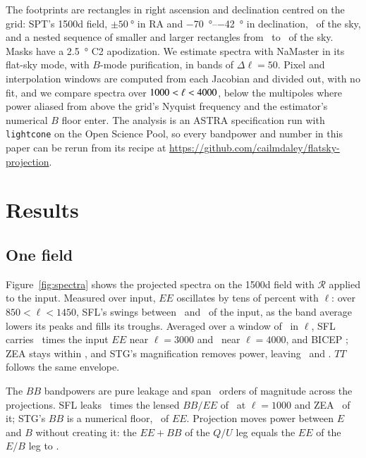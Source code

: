 \documentclass{aa}
\begin{document}
The footprints are rectangles in right ascension and declination centred on the grid: SPT's 1500d field, $\pm\SI{50}{\degree}$ in RA and \SIrange{-70}{-42}{\degree} in declination, \fieldfsky\ of the sky, and a nested sequence of smaller and larger rectangles from \sweepfskylo\ to \sweepfskyhi\ of the sky.
Masks have a \SI{2.5}{\degree} C2 apodization.
We estimate spectra with NaMaster \citep{alonso19} in its flat-sky mode, with $B$-mode purification, in bands of $\Delta\ell = 50$.
Pixel and interpolation windows are computed from each Jacobian and divided out, with no fit, and we compare spectra over $1000 < \ell < 4000$, below the multipoles where power aliased from above the grid's Nyquist frequency and the estimator's numerical $B$ floor enter.
The analysis is an ASTRA specification run with \texttt{lightcone} on the Open Science Pool, so every bandpower and number in this paper can be rerun from its recipe at \url{https://github.com/cailmdaley/flatsky-projection}.

\section{Results} \label{sec:results}

\subsection{One field} \label{subsec:spectra}

Figure~\ref{fig:spectra} shows the projected spectra on the 1500d field with $\mathcal{R}$ applied to the input.
Measured over input, $EE$ oscillates by tens of percent with $\ell$: over $850 < \ell < 1450$, SFL's swings between \EEswingSFLlo\ and \EEswingSFLhi\ of the input, as the band average lowers its peaks and fills its troughs.
Averaged over a window of \hannwidth\ in $\ell$, SFL carries \EEboxSFLthreeK\ times the input $EE$ near $\ell = 3000$ and \EEboxSFLfourK\ near $\ell = 4000$, and BICEP \EEboxBICEPfourK; ZEA stays within \EEboxZEAdev, and STG's magnification removes power, leaving \EEboxSTGthreeK\ and \EEboxSTGfourK.
$TT$ follows the same envelope.

The $BB$ bandpowers are pure leakage and span \bbdecadesField\ orders of magnitude across the projections.
SFL leaks \tfdSFLoverlens\ times the lensed $BB/EE$ of \lensedBBEE\ at $\ell = 1000$ and ZEA \ZEAoverlens\ of it; STG's $BB$ is a numerical floor, \floorField\ of $EE$.
Projection moves power between $E$ and $B$ without creating it: the $EE+BB$ of the $Q/U$ leg equals the $EE$ of the $E/B$ leg to \powerconserveAll.
\end{document}
